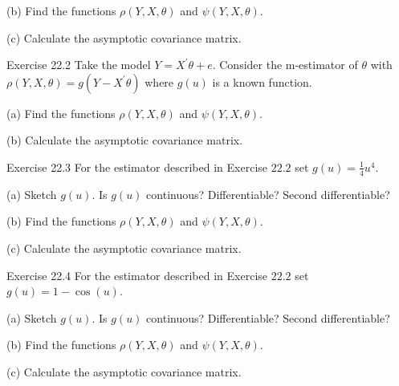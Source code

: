 \documentclass[10pt]{article}
\begin{document}
(b) Find the functions $\rho(Y, X, \theta)$ and $\psi(Y, X, \theta)$.

(c) Calculate the asymptotic covariance matrix.

Exercise 22.2 Take the model $Y=X^{\prime} \theta+e$. Consider the m-estimator of $\theta$ with $\rho(Y, X, \theta)=g\left(Y-X^{\prime} \theta\right)$ where $g(u)$ is a known function.

(a) Find the functions $\rho(Y, X, \theta)$ and $\psi(Y, X, \theta)$.

(b) Calculate the asymptotic covariance matrix.

Exercise 22.3 For the estimator described in Exercise $22.2$ set $g(u)=\frac{1}{4} u^{4}$.

(a) Sketch $g(u)$. Is $g(u)$ continuous? Differentiable? Second differentiable?

(b) Find the functions $\rho(Y, X, \theta)$ and $\psi(Y, X, \theta)$.

(c) Calculate the asymptotic covariance matrix.

Exercise 22.4 For the estimator described in Exercise $22.2$ set $g(u)=1-\cos (u)$.

(a) Sketch $g(u)$. Is $g(u)$ continuous? Differentiable? Second differentiable?

(b) Find the functions $\rho(Y, X, \theta)$ and $\psi(Y, X, \theta)$.

(c) Calculate the asymptotic covariance matrix.
\end{document}
